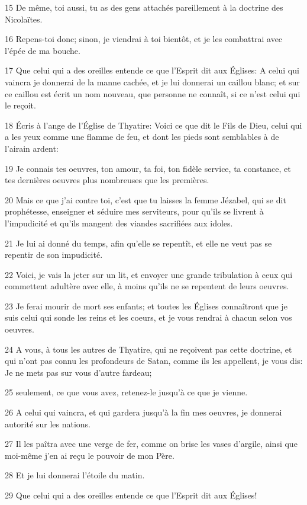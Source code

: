 \par 15 De même, toi aussi, tu as des gens attachés pareillement à la doctrine des Nicolaïtes.
\par 16 Repens-toi donc; sinon, je viendrai à toi bientôt, et je les combattrai avec l'épée de ma bouche.
\par 17 Que celui qui a des oreilles entende ce que l'Esprit dit aux Églises: A celui qui vaincra je donnerai de la manne cachée, et je lui donnerai un caillou blanc; et sur ce caillou est écrit un nom nouveau, que personne ne connaît, si ce n'est celui qui le reçoit.
\par 18 Écris à l'ange de l'Église de Thyatire: Voici ce que dit le Fils de Dieu, celui qui a les yeux comme une flamme de feu, et dont les pieds sont semblables à de l'airain ardent:
\par 19 Je connais tes oeuvres, ton amour, ta foi, ton fidèle service, ta constance, et tes dernières oeuvres plus nombreuses que les premières.
\par 20 Mais ce que j'ai contre toi, c'est que tu laisses la femme Jézabel, qui se dit prophétesse, enseigner et séduire mes serviteurs, pour qu'ils se livrent à l'impudicité et qu'ils mangent des viandes sacrifiées aux idoles.
\par 21 Je lui ai donné du temps, afin qu'elle se repentît, et elle ne veut pas se repentir de son impudicité.
\par 22 Voici, je vais la jeter sur un lit, et envoyer une grande tribulation à ceux qui commettent adultère avec elle, à moins qu'ils ne se repentent de leurs oeuvres.
\par 23 Je ferai mourir de mort ses enfants; et toutes les Églises connaîtront que je suis celui qui sonde les reins et les coeurs, et je vous rendrai à chacun selon vos oeuvres.
\par 24 A vous, à tous les autres de Thyatire, qui ne reçoivent pas cette doctrine, et qui n'ont pas connu les profondeurs de Satan, comme ils les appellent, je vous dis: Je ne mets pas sur vous d'autre fardeau;
\par 25 seulement, ce que vous avez, retenez-le jusqu'à ce que je vienne.
\par 26 A celui qui vaincra, et qui gardera jusqu'à la fin mes oeuvres, je donnerai autorité sur les nations.
\par 27 Il les paîtra avec une verge de fer, comme on brise les vases d'argile, ainsi que moi-même j'en ai reçu le pouvoir de mon Père.
\par 28 Et je lui donnerai l'étoile du matin.
\par 29 Que celui qui a des oreilles entende ce que l'Esprit dit aux Églises!

